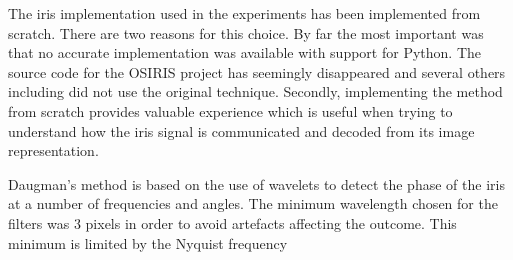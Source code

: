 The iris implementation used in the experiments has been implemented from scratch. There are two reasons for this choice. By far the most important was that no accurate implementation was available with support for Python. The source code for the OSIRIS project \parencite{osiris} has seemingly disappeared and several others including \parencite{rec1, rec2, rec3} did not use the original technique. Secondly, implementing the method from scratch provides valuable experience which is useful when trying to understand how the iris signal is communicated and decoded from its image representation.



Daugman's method is based on the use of wavelets to detect the phase of the iris at a number of frequencies and angles. The minimum wavelength chosen for the filters was 3 pixels in order to avoid artefacts affecting the outcome. This minimum is limited by the Nyquist frequency

